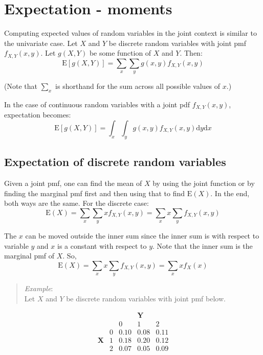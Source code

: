 \documentclass[
  letterpaper,
  DIV=11,
  numbers=noendperiod]{scrreprt}
\begin{document}
\section{Expectation - moments}\label{expectation---moments}

Computing expected values of random variables in the joint context is
similar to the univariate case. Let \(X\) and \(Y\) be discrete random
variables with joint pmf \(f_{X,Y}(x,y)\). Let \(g(X,Y)\) be some
function of \(X\) and \(Y\). Then: \[
\mbox{E}[g(X,Y)]=\sum_x\sum_y g(x,y)f_{X,Y}(x,y)
\]

(Note that \(\sum\limits_{x}\) is shorthand for the sum across all
possible values of \(x\).)

In the case of continuous random variables with a joint pdf
\(f_{X,Y}(x,y)\), expectation becomes: \[
\mbox{E}[g(X,Y)]=\int_x\int_y g(x,y)f_{X,Y}(x,y)\mbox{d} y \mbox{d} x
\]

\subsection{Expectation of discrete random
variables}\label{expectation-of-discrete-random-variables}

Given a joint pmf, one can find the mean of \(X\) by using the joint
function or by finding the marginal pmf first and then using that to
find \(\mbox{E}(X)\). In the end, both ways are the same. For the
discrete case: \[
\mbox{E}(X)=\sum_x\sum_y xf_{X,Y}(x,y) = \sum_x x \sum_y f_{X,Y}(x,y)
\]

The \(x\) can be moved outside the inner sum since the inner sum is with
respect to variable \(y\) and \(x\) is a constant with respect to \(y\).
Note that the inner sum is the marginal pmf of \(X\). So, \[
\mbox{E}(X)=\sum_x x \sum_y f_{X,Y}(x,y)=\sum_x x f_X(x)
\]

\newpage

\begin{quote}
\emph{Example}:\\
Let \(X\) and \(Y\) be discrete random variables with joint pmf below.
\end{quote}

\[
\begin{array}{cc|ccc} & & & \textbf{Y} &
\\ & & 0 & 1 & 2  
\\&\hline0 & 0.10 & 0.08 & 0.11  
\\\textbf{X} &1 & 0.18 & 0.20 & 0.12  
\\&2 & 0.07 & 0.05 & 0.09 
\end{array} 
\]
\end{document}
